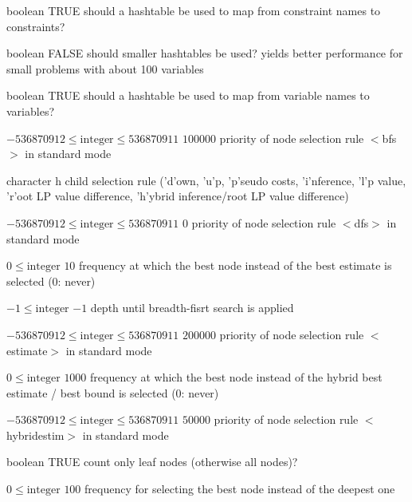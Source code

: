 %
{boolean}%
{TRUE}%
{should a hashtable be used to map from constraint names to constraints?}%
{}

%
{boolean}%
{FALSE}%
{should smaller hashtables be used? yields better performance for small problems with about 100 variables}%
{}

%
{boolean}%
{TRUE}%
{should a hashtable be used to map from variable names to variables?}%
{}

%
{$-536870912\leq\textrm{integer}\leq536870911$}%
{$100000$}%
{priority of node selection rule $<$bfs$>$ in standard mode}%
{}

%
{character}%
{h}%
{child selection rule ('d'own, 'u'p, 'p'seudo costs, 'i'nference, 'l'p value, 'r'oot LP value difference, 'h'ybrid inference/root LP value difference)}%
{}

%
{$-536870912\leq\textrm{integer}\leq536870911$}%
{$0$}%
{priority of node selection rule $<$dfs$>$ in standard mode}%
{}

%
{$0\leq\textrm{integer}$}%
{$10$}%
{frequency at which the best node instead of the best estimate is selected (0: never)}%
{}

%
{$-1\leq\textrm{integer}$}%
{$-1$}%
{depth until breadth-fisrt search is applied}%
{}

%
{$-536870912\leq\textrm{integer}\leq536870911$}%
{$200000$}%
{priority of node selection rule $<$estimate$>$ in standard mode}%
{}

%
{$0\leq\textrm{integer}$}%
{$1000$}%
{frequency at which the best node instead of the hybrid best estimate / best bound is selected (0: never)}%
{}

%
{$-536870912\leq\textrm{integer}\leq536870911$}%
{$50000$}%
{priority of node selection rule $<$hybridestim$>$ in standard mode}%
{}

%
{boolean}%
{TRUE}%
{count only leaf nodes (otherwise all nodes)?}%
{}

%
{$0\leq\textrm{integer}$}%
{$100$}%
{frequency for selecting the best node instead of the deepest one}%
{}


